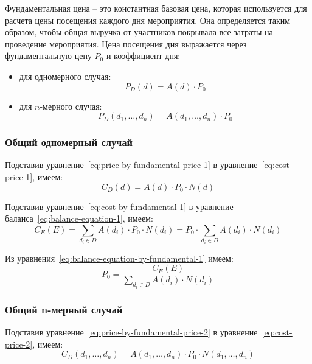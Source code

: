 Фундаментальная цена -- это константная базовая цена, которая используется для расчета цены посещения каждого дня мероприятия. Она определяется таким образом, чтобы общая выручка от участников покрывала все затраты на проведение мероприятия. Цена посещения дня выражается через фундаментальную цену $P_0$ и коэффициент дня:
\begin{itemize}[label=--]
	\item для одномерного случая:
	\begin{equation}
		P_D(d) = A(d) \cdot P_0
		\label{eq:price-by-fundamental-price-1}
	\end{equation}
	\item для $n$-мерного случая:
	\begin{equation}
		P_D(d_1, \dots, d_n) = A(d_1, \dots, d_n) \cdot P_0
		\label{eq:price-by-fundamental-price-2}
	\end{equation}
\end{itemize}  

\subsubsection{Общий одномерный случай}

Подставив уравнение~\ref{eq:price-by-fundamental-price-1} в уравнение~\ref{eq:cost-price-1}, имеем:
\begin{equation}
	C_D(d) = A(d) \cdot P_0 \cdot N(d)
	\label{eq:cost-by-fundamental-1}
\end{equation}

Подставив уравнение~\ref{eq:cost-by-fundamental-1} в уравнение баланса~\ref{eq:balance-equation-1}, имеем:
\begin{equation}
	C_E(E) = \sum_{d_i \in D}{A(d_i) \cdot P_0 \cdot N(d_i)} = P_0 \cdot \sum_{d_i \in D}{A(d_i) \cdot N(d_i)}
	\label{eq:balance-equation-by-fundamental-1}
\end{equation}

Из уравнения~\ref{eq:balance-equation-by-fundamental-1} имеем:
\begin{equation}
	P_0 = \frac{C_E(E)}{\sum_{d_i \in D}{A(d_i) \cdot N(d_i)}}
	\label{eq:fundamental-price-1}
\end{equation}

\subsubsection{Общий n-мерный случай}

Подставив уравнение~\ref{eq:price-by-fundamental-price-2} в уравнение~\ref{eq:cost-price-2}, имеем:
\begin{equation}
	C_D(d_1, \dots, d_n) = A(d_1, \dots, d_n) \cdot P_0 \cdot N(d_1, \dots, d_n)
	\label{eq:cost-by-fundamental-2}
\end{equation}

